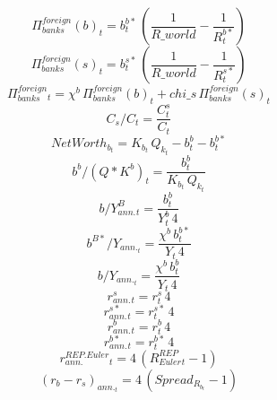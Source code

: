 \begin{dmath}
{\Pi^{foreign}_{banks}(b)_{t}}={b^{b*}_{t}}\, \left(\frac{1}{{R\_world}}-\frac{1}{{R^{b*}_{t}}}\right)
\end{dmath}
\begin{dmath}
{\Pi^{foreign}_{banks}(s)_{t}}={b^{s*}_{t}}\, \left(\frac{1}{{R\_world}}-\frac{1}{{R^{s*}_{t}}}\right)
\end{dmath}
\begin{dmath}
{\Pi^{foreign}_{banks}_{t}}={\chi^b }\, {\Pi^{foreign}_{banks}(b)_{t}}+{chi\_s}\, {\Pi^{foreign}_{banks}(s)_{t}}
\end{dmath}
\begin{dmath}
{ C_s / C  _{t}}=\frac{{C^s_{t}}}{{C_{t}}}
\end{dmath}
\begin{dmath}
{ NetWorth_b _{t}}={K_b_{t}}\, { Q_k _{t}}-{b^b_{t}}-{b^{b*}_{t}}
\end{dmath}
\begin{dmath}
{ b^b / (Q * K^b) _{t}}=\frac{{b^b_{t}}}{{K_b_{t}}\, { Q_k _{t}}}
\end{dmath}
\begin{dmath}
{ b / Y^B_{ann.} _{t}}=\frac{{b^b_{t}}}{{Y^b_{t}}\, 4}
\end{dmath}
\begin{dmath}
{ b^{B*}/ Y_{ann.} _{t}}=\frac{{\chi^b }\, {b^{b*}_{t}}}{{Y_{t}}\, 4}
\end{dmath}
\begin{dmath}
{b/ Y_{ann.} _{t}}=\frac{{\chi^b }\, {b^b_{t}}}{{Y_{t}}\, 4}
\end{dmath}
\begin{dmath}
{r^s_{ann.}_{t}}={r^s_{t}}\, 4
\end{dmath}
\begin{dmath}
{r^{s*}_{ann.}_{t}}={r^{s*}_{t}}\, 4
\end{dmath}
\begin{dmath}
{r^b_{ann.}_{t}}={r^b_{t}}\, 4
\end{dmath}
\begin{dmath}
{r^{b*}_{ann.}_{t}}={r^{b*}_{t}}\, 4
\end{dmath}
\begin{dmath}
{ r^{REP.Euler}_{ann.} _{t}}=4\, \left({ R^{REP}_{Euler} _{t}}-1\right)
\end{dmath}
\begin{dmath}
{ (r_b - r_s)_{ann.} _{t}}=4\, \left({Spread_R_b_{t}}-1\right)
\end{dmath}

